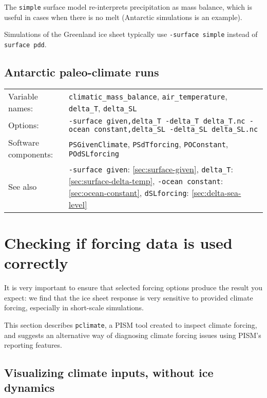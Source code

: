 \documentclass[titlepage,letterpaper,final]{scrartcl}
\def\variable#1{\texttt{#1}\index{NetCDF variables!\texttt{#1}}}
\begin{document}
The \texttt{simple} surface model re-interprets precipitation as mass balance, which is useful in cases when there is no melt (Antarctic simulations is an example).

Simulations of the Greenland ice sheet typically use \texttt{-surface~simple} instead of \texttt{surface~pdd}.

\subsection{Antarctic paleo-climate runs}
\label{sec:use-case-antarctica-paleo}

\begin{center}
  \begin{tabular}{lp{}}
    \toprule
    Variable names: & \variable{climatic_mass_balance}, \variable{air_temperature}, \variable{delta_T}, \variable{delta_SL}\\
    Options: & \texttt{-surface given,delta_T \mbox{-delta_T delta_T.nc}
      \mbox{-ocean constant,delta_SL} -delta_SL delta_SL.nc} \\
    Software   components:  &   \texttt{PSGivenClimate},  \texttt{PSdTforcing},
    \texttt{POConstant}, \texttt{POdSLforcing}\\
    See   also    &   \texttt{-surface~given}:   \ref{sec:surface-given},
    \texttt{delta_T}: \ref{sec:surface-delta-temp}, \texttt{-ocean~constant}: \ref{sec:ocean-constant}, \texttt{dSLforcing}: \ref{sec:delta-sea-level}\\
    \bottomrule
  \end{tabular}
\end{center}

\section{Checking if forcing data is used correctly}
\label{sec:checking-forcing}

It is very important to ensure that selected forcing options produce the result you expect: we find that the ice sheet response is very sensitive to provided climate forcing, especially in short-scale simulations.

This section describes \texttt{pclimate}, a PISM tool created to inspect climate forcing, and suggests an alternative way of diagnosing climate forcing issues using PISM's reporting features.

\subsection{Visualizing climate inputs, without ice dynamics}
\label{sec:pclimate}
\end{document}
